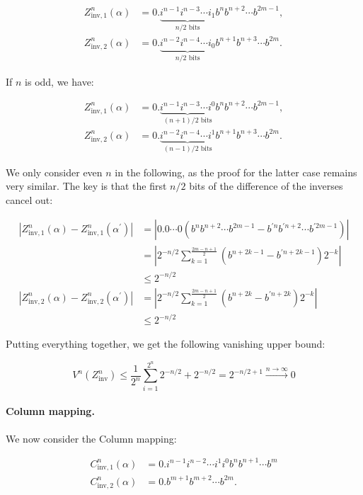 \documentclass[10pt,letterpaper]{article}
\begin{document}
$$
\begin{aligned}
Z^n_{\textrm{inv},1}(\alpha) &= 0.\underbrace{i^{n-1} i^{n-3} \cdots i_1}_\text{$n/2$ bits} b^n b^{n+2} \cdots b^{2m-1}, \\
Z^n_{\textrm{inv},2}(\alpha) &= 0.\underbrace{i^{n-2} i^{n-4} \cdots i_0}_\text{$n/2$ bits} b^{n+1} b^{n+3} \cdots b^{2m}.
\end{aligned}
$$

If $n$ is odd, we have:

$$
\begin{aligned}
Z^n_{\textrm{inv},1}(\alpha) &= 0.\underbrace{i^{n-1} i^{n-3} \cdots i^0}_\text{$(n+1)/2$ bits} b^n b^{n+2} \cdots b^{2m-1}, \\
Z^n_{\textrm{inv},2}(\alpha) &= 0.\underbrace{i^{n-2} i^{n-4} \cdots i^1}_\text{$(n-1)/2$ bits} b^{n+1} b^{n+3} \cdots b^{2m}.
\end{aligned}
$$

We only consider even $n$ in the following, as the proof for the latter case remains very similar. The key is that the first $n/2$ bits of the difference of the inverses cancel out:

$$
\begin{aligned}
|Z^n_{\textrm{inv},1}(\alpha) - Z^n_{\textrm{inv},1}(\alpha^\prime)| &= \left|0.0 \cdots 0 (b^n b^{n+2} \cdots b^{2m-1} - b^{\prime n} b^{\prime n+2} \cdots b^{\prime 2m-1})\right| \\
&= \left|2^{-n/2} \sum_{k=1}^{\tfrac{2m-n+1}{2}} (b^{n+2k-1} - b^{\prime n+2k-1}) 2^{-k}\right| \\
&\leq 2^{-n/2} \\
|Z^n_{\textrm{inv},2}(\alpha) - Z^n_{\textrm{inv},2}(\alpha^\prime)| &= \left|2^{-n/2} \sum_{k=1}^{\tfrac{2m-n+1}{2}} (b^{n+2k} - b^{\prime n+2k}) 2^{-k}\right| \\
&\leq 2^{-n/2}
\end{aligned}
$$

Putting everything together, we get the following vanishing upper bound:

$$
V^n(Z^n_\textrm{inv}) \leq \frac{1}{2^n} \sum_{i=1}^{2^n} 2^{-n/2} + 2^{-n/2} = 2^{-n/2+1} \xrightarrow{n \to \infty} 0
$$

\paragraph{Column mapping.} We now consider the Column mapping:

$$
\begin{aligned}
C^n_{\textrm{inv},1}(\alpha) &= 0.i^{n-1} i^{n-2} \cdots i^1 i^0 b^n b^{n+1} \cdots b^m \\
C^n_{\textrm{inv},2}(\alpha) &= 0.b^{m+1} b^{m+2} \cdots b^{2m}.
\end{aligned}
$$
\end{document}
